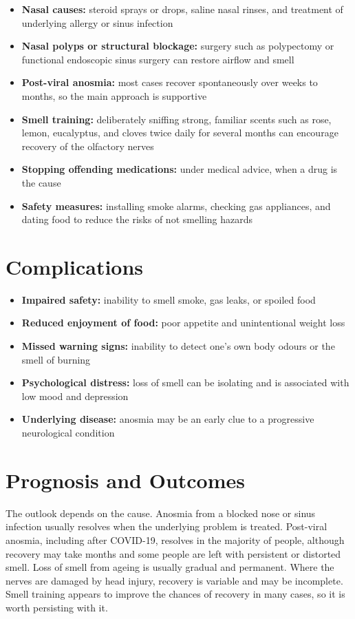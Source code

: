 \begin{itemize}
    \item \textbf{Nasal causes:} steroid sprays or drops, saline nasal rinses, and treatment of underlying allergy or sinus infection
    \item \textbf{Nasal polyps or structural blockage:} surgery such as polypectomy or functional endoscopic sinus surgery can restore airflow and smell
    \item \textbf{Post-viral anosmia:} most cases recover spontaneously over weeks to months, so the main approach is supportive
    \item \textbf{Smell training:} deliberately sniffing strong, familiar scents such as rose, lemon, eucalyptus, and cloves twice daily for several months can encourage recovery of the olfactory nerves
    \item \textbf{Stopping offending medications:} under medical advice, when a drug is the cause
    \item \textbf{Safety measures:} installing smoke alarms, checking gas appliances, and dating food to reduce the risks of not smelling hazards
\end{itemize}

\section*{Complications}
\begin{itemize}
    \item \textbf{Impaired safety:} inability to smell smoke, gas leaks, or spoiled food
    \item \textbf{Reduced enjoyment of food:} poor appetite and unintentional weight loss
    \item \textbf{Missed warning signs:} inability to detect one's own body odours or the smell of burning
    \item \textbf{Psychological distress:} loss of smell can be isolating and is associated with low mood and depression
    \item \textbf{Underlying disease:} anosmia may be an early clue to a progressive neurological condition
\end{itemize}

\section*{Prognosis and Outcomes}
The outlook depends on the cause. Anosmia from a blocked nose or sinus infection usually resolves when the underlying problem is treated. Post-viral anosmia, including after COVID-19, resolves in the majority of people, although recovery may take months and some people are left with persistent or distorted smell. Loss of smell from ageing is usually gradual and permanent. Where the nerves are damaged by head injury, recovery is variable and may be incomplete. Smell training appears to improve the chances of recovery in many cases, so it is worth persisting with it.


